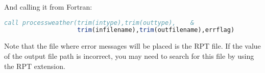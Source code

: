 And calling it from Fortran:

\begin{lstlisting}[language=Fortran]
call processweather(trim(intype),trim(outtype),    &
                    trim(infilename),trim(outfilename),errflag)
\end{lstlisting}

Note that the file where error messages will be placed is the RPT file. If the value of the output file path is incorrect, you may need to search for this file by using the RPT extension.

